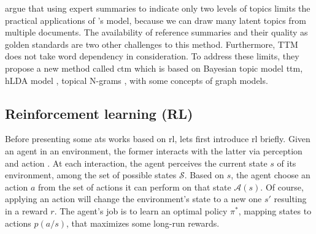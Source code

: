 \citet{15-yang-al} argue that using expert summaries to indicate only two levels of topics limits the practical applications of \citet{11-celikyilmaz-hakkani}'s model, because we can draw many latent topics from multiple documents.
The availability of reference summaries and their quality as golden standards are two other challenges to this method. 
Furthermore, TTM does not take word dependency in consideration. 
To address these limits, they propose a new method called \ac{ctm} which is based on Bayesian topic model \ac{ttm}, hLDA model \citep{10-blei-al}, topical N-grams \citep{07-wang-al}, with some concepts of graph models. 

\subsection{Reinforcement learning (RL)}

Before presenting some \ac{ats} works based on \ac{rl}, lets first introduce \ac{rl} briefly. 
Given an agent in an environment, the former interacts with the latter via perception and action \citep{96-kaelbling-al}.
At each interaction, the agent perceives the current state $ s $ of its environment, among the set of possible states $ \mathcal{S} $.
Based on $ s $, the agent choose an action $ a $ from the set of actions it can perform on that state $ \mathcal{A}(s) $.
Of course, applying an action will change the environment's state to a new one $ s' $ resulting in a reward $ r $.
The agent's job is to learn an optimal policy $ \pi^* $, mapping states to actions $ p(a/s) $, that maximizes some long-run rewards.


